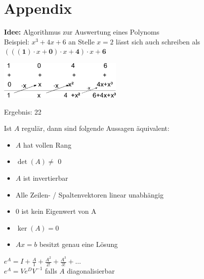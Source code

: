 \documentclass[a4paper,twocolumn]{article}
\begin{document}
\section{Appendix}
\begin{appendix}
	\begin{fmerke}
		\textbf{Idee:} Algorithmus zur Auswertung eines Polynoms\\[-3mm]
		
		Beispiel: $x^3+4x+6$ an Stelle $x = 2$ lässt sich auch schreiben als $(((\mathbf{1}) \cdot x + \mathbf{0}) \cdot x + \mathbf{4}) \cdot x + \mathbf{6}$
		\begin{center}
			\includegraphics[width=6cm]{horner-schema}
		\end{center}
		Ergebnis: 22
	\end{fmerke}

	\begin{fmerke}
		Ist $A$ regulär, dann sind folgende Aussagen äquivalent:\\[-6mm]
		\begin{itemize}
			\item $A$ hat vollen Rang\\[-6mm]
			\item $\det(A) \neq$ 0\\[-6mm]
			\item $A$ ist invertierbar\\[-6mm]
			\item Alle Zeilen- / Spaltenvektoren linear unabhängig\\[-6mm]
			\item 0 ist kein Eigenwert von A\\[-6mm]
			\item $\ker(A) = 0$\\[-6mm]
			\item$Ax = b$ besitzt genau eine Lösung\\[-6mm]
		\end{itemize}
	\end{fmerke}
	
	\begin{fmerke}
		$e^A = I + \frac{A}{1} + \frac{A^2}{2!} + \frac{A^3}{3!} + \ldots$\\
		$e^A = Ve^DV^{-1}$ falls $A$ diagonalisierbar
	\end{fmerke}
	

\end{appendix}
\end{document}
